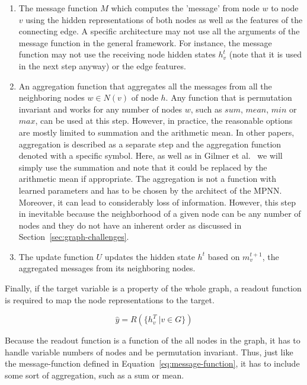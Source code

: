 \begin{enumerate}
	\item The message function $M$ which computes the 'message' from node $w$ to node $v$ using the hidden representations of both nodes as well as the features of the connecting edge. A specific architecture may not use all the arguments of the message function in the general framework. For instance, the message function may not use the receiving node hidden states $h_v^t$ (note that it is used in the next step anyway) or the edge features.
	\item An aggregation function that aggregates all the messages from all the neighboring nodes $w \in N(v)$ of node $h$. Any function that is permutation invariant and works for any number of nodes $w$, such as $sum$, $mean$, $min$ or $max$, can be used at this step. However, in practice, the reasonable options are mostly limited to summation and the arithmetic mean.	
	In other papers, aggregation is described as a separate step and the aggregation function denoted with a specific symbol. Here, as well as in Gilmer et al.~\cite{Gilmer2017} we will simply use the summation and note that it could be replaced by the arithmetic mean if appropriate.
	The aggregation is not a function with learned parameters and has to be chosen by the architect of the MPNN. Moreover, it can lead to considerably loss of information. However, this step in inevitable because the neighborhood of a given node can be any number of nodes and they do not have an inherent order as discussed in Section~\ref{sec:graph-challenges}.
	\item The update function $U$ updates the hidden state $h^t$ based on  $m_v^{t+1}$, the aggregated messages from its neighboring nodes.
\end{enumerate}

Finally, if the target variable is a property of the whole graph, a readout function is required to map the node representations to the target.

\begin{equation}
	\hat{y} = R(\{h_v^T\ | v \in G\}) 
\end{equation}
\label{eq:readout-function}

Because the readout function is a function of the all nodes in the graph, it has to handle variable numbers of nodes and be permutation invariant. Thus, just like the message-function defined in Equation~\ref{eq:message-function}, it has to include some sort of aggregation, such as a sum or mean.



